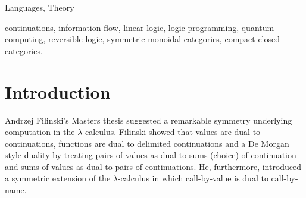 \documentclass[preprint]{sigplanconf}
\newcommand{\lcal}{\ensuremath{\lambda}-calculus\xspace}
\begin{document}
\begin{abstract}

\end{abstract}


\terms
Languages, Theory

\keywords continuations, information flow, linear logic, logic programming,
quantum computing, reversible logic, symmetric monoidal categories, compact
closed categories.

\section{Introduction}

Andrzej Filinski's Masters thesis
\cite{Filinski:1989:DCI:648332.755574} suggested a remarkable symmetry
underlying computation in the \lcal. Filinski showed that values are
dual to continuations, functions are dual to delimited continuations
and a De Morgan style duality by treating pairs of values as dual to
sums (choice) of continuation and sums of values as dual to pairs of
continuations. He, furthermore, introduced a symmetric extension of
the $\lambda$-calculus in which call-by-value is dual to call-by-name.
\end{document}

